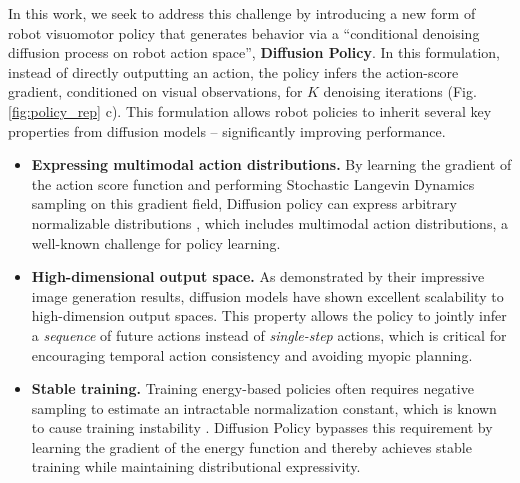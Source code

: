 In this work, we seek to address this challenge by introducing a new form of robot visuomotor policy that generates behavior via a ``conditional denoising diffusion process \cite{ho2020denoising} on robot action space'', \textbf{Diffusion Policy}. In this formulation, instead of directly outputting an action, the policy infers the action-score gradient, conditioned on visual observations, for $K$ denoising iterations (Fig. \ref{fig:policy_rep} c). 
This formulation allows robot policies to inherit several key properties from diffusion models -- significantly improving performance.
\begin{itemize} 
    
    \item \textbf{Expressing multimodal action distributions.} 
     By learning the gradient of the action score function \cite{song2019score} and performing Stochastic Langevin Dynamics sampling on this gradient field, Diffusion policy can express arbitrary normalizable distributions \cite{neal2011mcmc}, which includes multimodal action distributions, a well-known challenge for policy learning.
     

    \item \textbf{High-dimensional output space.} As demonstrated by their impressive image generation results, diffusion models have shown excellent scalability to high-dimension output spaces. This property allows the policy to jointly infer a \textit{sequence} of future actions instead of \textit{single-step} actions, which is critical for encouraging temporal action consistency and avoiding myopic planning.  
    
    \item \textbf{Stable training.} 
    Training energy-based policies often requires negative sampling to estimate an intractable normalization constant, which is known to cause training instability \cite{du2020improved,ibc}. Diffusion Policy bypasses this requirement by learning the gradient of the energy function and thereby achieves stable training while maintaining distributional expressivity. 

    
\end{itemize}

